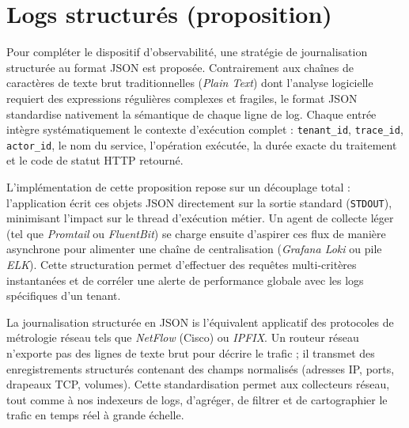 \section{Logs structurés (proposition)}

Pour compléter le dispositif d'observabilité, une stratégie de journalisation structurée au format JSON est proposée. Contrairement aux chaînes de caractères de texte brut traditionnelles (\emph{Plain Text}) dont l'analyse logicielle requiert des expressions régulières complexes et fragiles, le format JSON standardise nativement la sémantique de chaque ligne de log. Chaque entrée intègre systématiquement le contexte d'exécution complet : \texttt{tenant\_id}, \texttt{trace\_id}, \texttt{actor\_id}, le nom du service, l'opération exécutée, la durée exacte du traitement et le code de statut HTTP retourné.

L'implémentation de cette proposition repose sur un découplage total : l'application écrit ces objets JSON directement sur la sortie standard (\texttt{STDOUT}), minimisant l'impact sur le thread d'exécution métier. Un agent de collecte léger (tel que \emph{Promtail} ou \emph{FluentBit}) se charge ensuite d'aspirer ces flux de manière asynchrone pour alimenter une chaîne de centralisation (\emph{Grafana Loki} ou pile \emph{ELK}). Cette structuration permet d'effectuer des requêtes multi-critères instantanées et de corréler une alerte de performance globale avec les logs spécifiques d'un tenant.

\begin{analogie}
La journalisation structurée en JSON is l'équivalent applicatif des protocoles de métrologie réseau tels que \emph{NetFlow} (Cisco) ou \emph{IPFIX}. Un routeur réseau n'exporte pas des lignes de texte brut pour décrire le trafic ; il transmet des enregistrements structurés contenant des champs normalisés (adresses IP, ports, drapeaux TCP, volumes). Cette standardisation permet aux collecteurs réseau, tout comme à nos indexeurs de logs, d'agréger, de filtrer et de cartographier le trafic en temps réel à grande échelle.
\end{analogie}